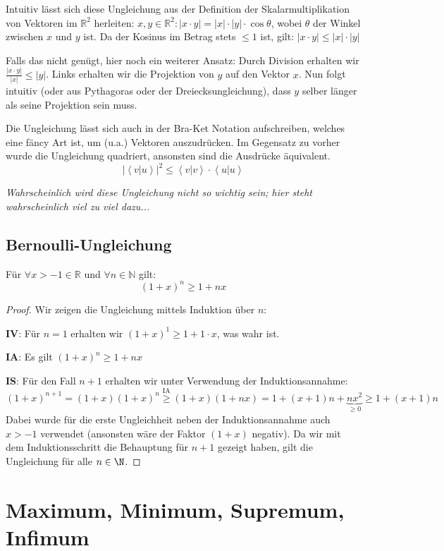 Intuitiv lässt sich diese Ungleichung aus der Definition der Skalarmultiplikation von Vektoren im $\mathbb{R}^2$ herleiten: $x, y \in \mathbb{R}^2: |x \cdot y| = |x|\cdot|y|\cdot\cos{\theta}$, wobei $\theta$ der Winkel zwischen $x$ und $y$ ist. Da der Kosinus im Betrag stets $\leq 1$ ist, gilt: $|x \cdot y| \leq |x|\cdot|y|$ 

Falls das nicht genügt, hier noch ein weiterer Ansatz: Durch Division erhalten wir $\frac{|x \cdot y|}{|x|} \leq |y|$. Links erhalten wir die Projektion von $y$ auf den Vektor $x$. Nun folgt intuitiv (oder aus Pythagoras oder der Dreiecksungleichung), dass $y$ selber länger als seine Projektion sein muss.

Die Ungleichung lässt sich auch in der Bra-Ket Notation aufschreiben, welches eine fäncy Art ist, um (u.a.) Vektoren auszudrücken. Im Gegensatz zu vorher wurde die Ungleichung quadriert, ansonsten sind die Ausdrücke äquivalent.
$$|\left< v | u\right>|^2\leq \left< v | v\right>\cdot\left< u | u\right>$$

\textit{Wahrscheinlich wird diese Ungleichung nicht so wichtig sein; hier steht wahrscheinlich viel zu viel dazu...}

\subsection{Bernoulli-Ungleichung} \label{cha_bernoulli_uneq}
Für $\forall x > -1 \in \mathbb{R}$ und $\forall n \in \mathbb{N}$ gilt:
$$(1+x)^n \geq 1 + nx$$
\begin{proof} Wir zeigen die Ungleichung mittels Induktion über $n$:

\textbf{IV}: Für $n=1$ erhalten wir $(1 + x)^1 \geq 1 + 1 \cdot x$, was wahr ist.

\textbf{IA}: Es gilt $(1+x)^n \geq 1 + nx$

\textbf{IS}: Für den Fall $n+1$ erhalten wir unter Verwendung der Induktionsannahme:
$$ (1+x)^{n+1} = (1+x)(1+x)^n \stackrel{\text{IA}}{\geq} (1+x)(1 + nx) = 1 + (x+1)n + \underbrace{nx^2}_{\geq 0} \geq  1 + (x+1)n$$
Dabei wurde für die erste Ungleichheit neben der Induktionsannahme auch $x>-1$ verwendet (ansonsten wäre der Faktor $(1+x)$ negativ). Da wir mit dem Induktionsschritt die Behauptung für $n+1$ gezeigt haben, gilt die Ungleichung für alle $n \in \N$.
\end{proof}

\section{Maximum, Minimum, Supremum, Infimum}


